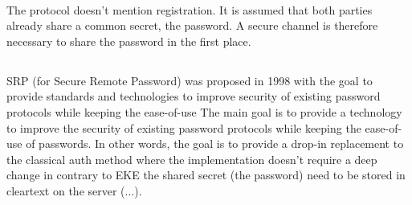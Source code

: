 \documentclass[../report.tex]{subfiles}
\begin{document}

\paragraph{}
The protocol doesn't mention registration. It is assumed that both parties already share a common secret, the password. A secure channel is therefore necessary to share the password in the first place.





\subsection{}
SRP (for Secure Remote Password) was proposed in 1998 with the goal to provide standards and technologies to improve security of existing password protocols while keeping the ease-of-use
The main goal is to provide a technology to improve the security of existing password protocols while keeping the ease-of-use of passwords. In other words, the goal is to provide a drop-in replacement to the classical auth method where the implementation doesn't require a deep change in contrary to EKE the shared secret (the password) need to be stored in cleartext on the server (...).




\end{document}
